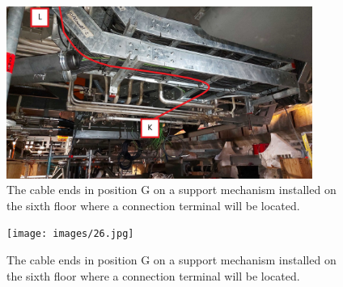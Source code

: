 \begin{figure}
  \centering
  \includegraphics[width=10cm]{images/25.jpg}
  \caption*{The cable ends in position G on a support mechanism installed on the sixth floor where a connection terminal will be located.}
\end{figure}

\begin{figure}
  \centering
  \texttt{[image: images/26.jpg]}
  \caption*{The cable ends in position G on a support mechanism installed on the sixth floor where a connection terminal will be located.}
\end{figure}

